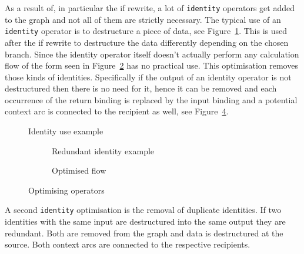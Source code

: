 As a result of, in particular the if rewrite, a lot of \texttt{identity} operators get added to the graph and not all of them are strictly necessary.
The typical use of an \texttt{identity} operator is to destructure a piece of data, see Figure~\ref{fig:identity-example}.
This is used after the if rewrite to destructure the data differently  depending on the chosen branch.
Since the identity operator itself doesn't actually perform any calculation flow of the form seen in Figure~\ref{fig:redundant-identity-example} has no practical use.
This optimisation removes those kinds of identities.
Specifically if the output of an identity operator is not destructured then there is no need for it, hence it can be removed and each occurrence of the return binding is replaced by the input binding and a potential context arc is connected to the recipient as well, see Figure~\ref{fig:redundant-identity-example-rewritten}.

\begin{figure}
    \caption{Identity use example}
    \label{fig:identity-example}
\end{figure}

\begin{figure}
    \begin{subfigure}[b]{.5\textwidth}
        \caption{Redundant identity example}
        \label{fig:redundant-identity-example}
    \end{subfigure}
    \begin{subfigure}[b]{.5\textwidth}
        \caption{Optimised flow}
        \label{fig:redundant-identity-example-rewritten}
    \end{subfigure}
    \caption{Optimising  operators}

\end{figure}

A second \texttt{identity} optimisation is the removal of duplicate identities.
If two identities with the same input are destructured into the same output they are redundant.
Both are removed from the graph and data is destructured at the source.
Both context arcs are connected to the respective recipients.
